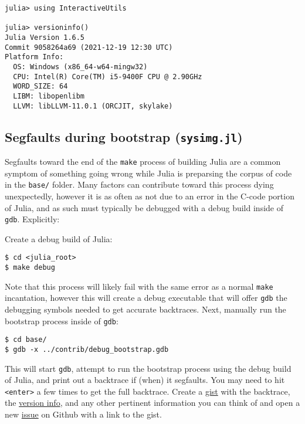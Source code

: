 \begin{verbatim}
julia> using InteractiveUtils

julia> versioninfo()
Julia Version 1.6.5
Commit 9058264a69 (2021-12-19 12:30 UTC)
Platform Info:
  OS: Windows (x86_64-w64-mingw32)
  CPU: Intel(R) Core(TM) i5-9400F CPU @ 2.90GHz
  WORD_SIZE: 64
  LIBM: libopenlibm
  LLVM: libLLVM-11.0.1 (ORCJIT, skylake)
\end{verbatim}



\hypertarget{3553581061539675492}{}


\subsection{Segfaults during bootstrap (\texttt{sysimg.jl})}



Segfaults toward the end of the \texttt{make} process of building Julia are a common symptom of something going wrong while Julia is preparsing the corpus of code in the \texttt{base/} folder.  Many factors can contribute toward this process dying unexpectedly, however it is as often as not due to an error in the C-code portion of Julia, and as such must typically be debugged with a debug build inside of \texttt{gdb}.  Explicitly:



Create a debug build of Julia:




\begin{lstlisting}
$ cd <julia_root>
$ make debug
\end{lstlisting}



Note that this process will likely fail with the same error as a normal \texttt{make} incantation, however this will create a debug executable that will offer \texttt{gdb} the debugging symbols needed to get accurate backtraces.  Next, manually run the bootstrap process inside of \texttt{gdb}:




\begin{lstlisting}
$ cd base/
$ gdb -x ../contrib/debug_bootstrap.gdb
\end{lstlisting}



This will start \texttt{gdb}, attempt to run the bootstrap process using the debug build of Julia, and print out a backtrace if (when) it segfaults.  You may need to hit \texttt{<enter>} a few times to get the full backtrace.  Create a \href{https://gist.github.com}{gist} with the backtrace, the \hyperlink{4601189142062189569}{version info}, and any other pertinent information you can think of and open a new \href{https://github.com/JuliaLang/julia/issues?q=is\%3Aopen}{issue} on Github with a link to the gist.



